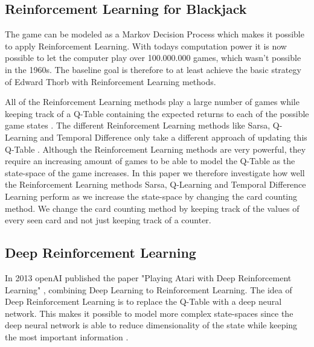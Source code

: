\documentclass[conference]{IEEEtran}
\begin{document}
\subsection{Reinforcement Learning for Blackjack}
The game can be modeled as a Markov Decision Process which makes it possible to apply Reinforcement Learning.
With todays computation power it is now possible to let the computer play over 100.000.000 games, which wasn't possible in the 1960s. 
The baseline goal is therefore to at least achieve the basic strategy of Edward Thorb \cite{b1} with Reinforcement Learning methods.

All of the Reinforcement Learning methods play a large number of games while keeping track of a Q-Table containing the expected returns to each of the possible game states \cite{?}.
The different Reinforcement Learning methods like Sarsa, Q-Learning and Temporal Difference only take a different approach of updating this Q-Table \cite{?}.
Although the Reinforcement Learning methods are very powerful, they require an increasing amount of games to be able to model the Q-Table as the state-space of the game increases. 
In this paper we therefore investigate how well the Reinforcement Learning methods Sarsa, Q-Learning and Temporal Difference Learning perform as we increase the state-space by changing the card counting method. 
We change the card counting method by keeping track of the values of every seen card and not just keeping track of a counter. 

\subsection{Deep Reinforcement Learning}
In 2013 openAI published the paper "Playing Atari with Deep Reinforcement Learning" \cite{b2}, combining Deep Learning to Reinforcement Learning.
The idea of Deep Reinforcement Learning is to replace the Q-Table with a deep neural network.
This makes it possible to model more complex state-spaces since the deep neural network is able to reduce dimensionality of the state while keeping the most important information \cite{?}.



\end{document}
